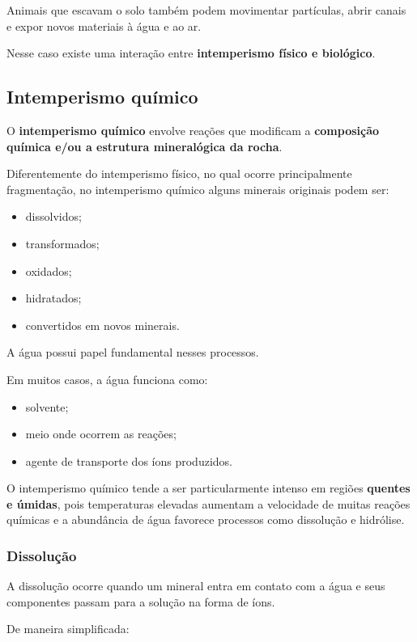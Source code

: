 \documentclass[a4paper,12pt]{article}
\theoremstyle{definition}
\theoremstyle{definition}
\theoremstyle{definition}
\begin{document}
Animais que escavam o solo também podem movimentar partículas, abrir canais e expor novos materiais à água e ao ar.

Nesse caso existe uma interação entre \textbf{intemperismo físico e biológico}.

\subsection{Intemperismo químico}

O \textbf{intemperismo químico} envolve reações que modificam a \textbf{composição química e/ou a estrutura mineralógica da rocha}.

Diferentemente do intemperismo físico, no qual ocorre principalmente fragmentação, no intemperismo químico alguns minerais originais podem ser:

\begin{itemize}
    \item dissolvidos;
    \item transformados;
    \item oxidados;
    \item hidratados;
    \item convertidos em novos minerais.
\end{itemize}

A água possui papel fundamental nesses processos.

Em muitos casos, a água funciona como:

\begin{itemize}
    \item solvente;
    \item meio onde ocorrem as reações;
    \item agente de transporte dos íons produzidos.
\end{itemize}

O intemperismo químico tende a ser particularmente intenso em regiões \textbf{quentes e úmidas}, pois temperaturas elevadas aumentam a velocidade de muitas reações químicas e a abundância de água favorece processos como dissolução e hidrólise.

\subsubsection{Dissolução}

A dissolução ocorre quando um mineral entra em contato com a água e seus componentes passam para a solução na forma de íons.

De maneira simplificada:
\end{document}
